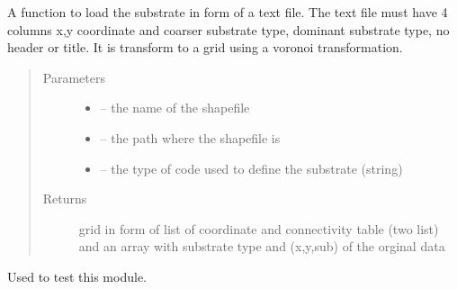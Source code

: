 \documentclass[letterpaper,10pt,english]{sphinxmanual}
\begin{document}
\begin{fulllineitems}
\label{\detokenize{index:src.substrate.load_sub_txt}}
A function to load the substrate in form of a text file. The text file must have 4 columns x,y coordinate and
coarser substrate type, dominant substrate type, no header or title. It is transform to a grid using a voronoi
transformation.
\begin{quote}\begin{description}
\item[{Parameters}] \leavevmode\begin{itemize}
\item {} 
 -- the name of the shapefile

\item {} 
 -- the path where the shapefile is

\item {} 
 -- the type of code used to define the substrate (string)

\end{itemize}

\item[{Returns}] \leavevmode
grid in form of list of coordinate and connectivity table (two list)
and an array with substrate type and (x,y,sub) of the orginal data

\end{description}\end{quote}

\end{fulllineitems}


\begin{fulllineitems}
\label{\detokenize{index:src.substrate.main}}
Used to test this module.

\end{fulllineitems}

\end{document}
